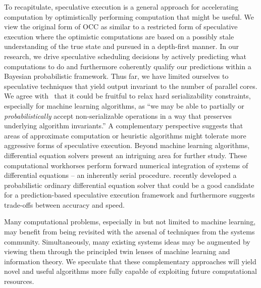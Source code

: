 \documentclass[angelino.tex]{subfiles}
\begin{document}
To recapitulate, speculative execution is a general approach for accelerating
computation by optimistically performing computation that might be useful.
%
We view the original form of OCC as similar to a restricted form of
speculative execution where the optimistic computations are based on a possibly
stale understanding of the true state and pursued in a depth-first manner.
%
In our research, we drive speculative scheduling decisions by actively 
predicting what computations to do and furthermore coherently qualify our
predictions within a Bayesian probabilistic framework.
Thus far, we have limited ourselves to speculative techniques
that yield output invariant to the number of parallel cores.
%
We agree with~\citet{pan:2013-optimistic} that
it could be fruitful to relax hard serializability constraints,
especially for machine learning algorithms, as ``we may be able to partially or 
\emph{probabilistically} accept non-serializable operations in a way that
preserves underlying algorithm invariants.''
%
A complementary perspective suggests that areas of approximate computation or
heuristic algorithms might tolerate more aggressive forms of speculative execution.
%
Beyond machine learning algorithms, differential equation solvers present an
intriguing area for further study.
These computational workhorses perform forward numerical integration of systems
of differential equations -- an inherently serial procedure.
\citet{schober:2014-ode} recently developed a probabilistic ordinary
differential equation solver that could be a good candidate for a
prediction-based speculative execution framework and furthermore suggests
trade-offs between accuracy and speed.


Many computational problems, especially in but not limited to machine learning,
may benefit from being revisited with the arsenal of techniques from
the systems community.
%
Simultaneously, many existing systems ideas may be augmented by viewing them
through the principled twin lenses of machine learning and information theory.
%
We speculate that these complementary approaches will yield novel and useful
algorithms more fully capable of exploiting future computational resources.
\end{document}
